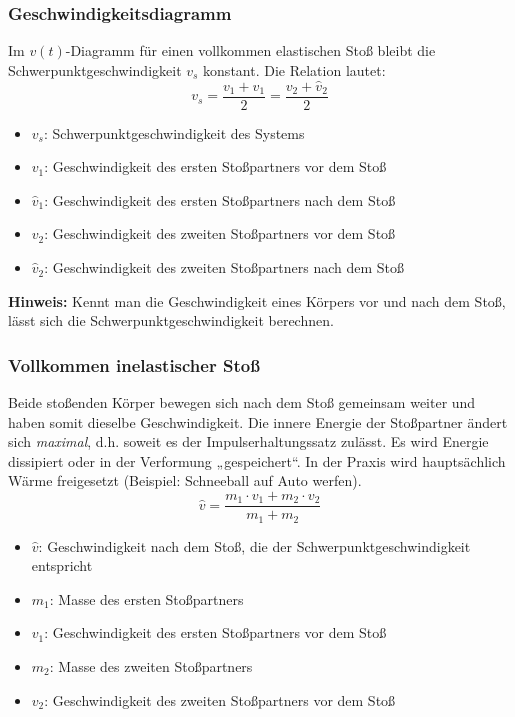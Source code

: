 \documentclass[a4paper, 8pt]{extarticle}
\begin{document}
\begin{landscape}
\begin{multicols*}{3}
\subsubsection{Geschwindigkeitsdiagramm}
Im \( v(t) \)-Diagramm für einen vollkommen elastischen Stoß bleibt die Schwerpunktgeschwindigkeit \( v_s \) konstant. Die Relation lautet:
\[
v_s = \frac{v_1 + \hat{v}_1}{2} = \frac{v_2 + \hat{v}_2}{2}
\]
{\footnotesize
\begin{itemize}
    \item \( v_s \): Schwerpunktgeschwindigkeit des Systems
    \item \( v_1 \): Geschwindigkeit des ersten Stoßpartners vor dem Stoß
    \item \( \hat{v}_1 \): Geschwindigkeit des ersten Stoßpartners nach dem Stoß
    \item \( v_2 \): Geschwindigkeit des zweiten Stoßpartners vor dem Stoß
    \item \( \hat{v}_2 \): Geschwindigkeit des zweiten Stoßpartners nach dem Stoß
\end{itemize}
}

\textbf{Hinweis:} Kennt man die Geschwindigkeit eines Körpers vor und nach dem Stoß, lässt sich die Schwerpunktgeschwindigkeit berechnen.











\subsubsection{Vollkommen inelastischer Stoß}

Beide stoßenden Körper bewegen sich nach dem Stoß gemeinsam weiter und haben somit dieselbe Geschwindigkeit. Die innere Energie der Stoßpartner ändert sich \textit{maximal}, d.h. soweit es der Impulserhaltungssatz zulässt. Es wird Energie dissipiert oder in der Verformung „gespeichert“. In der Praxis wird hauptsächlich Wärme freigesetzt (Beispiel: Schneeball auf Auto werfen).
\[
\hat{v} = \frac{m_1 \cdot v_1 + m_2 \cdot v_2}{m_1 + m_2}
\]

\begin{itemize}
    \item \( \hat{v} \): Geschwindigkeit nach dem Stoß, die der Schwerpunktgeschwindigkeit entspricht
    \item \( m_1 \): Masse des ersten Stoßpartners
    \item \( v_1 \): Geschwindigkeit des ersten Stoßpartners vor dem Stoß
    \item \( m_2 \): Masse des zweiten Stoßpartners
    \item \( v_2 \): Geschwindigkeit des zweiten Stoßpartners vor dem Stoß
\end{itemize}


\end{multicols*}
\end{landscape}
\end{document}
